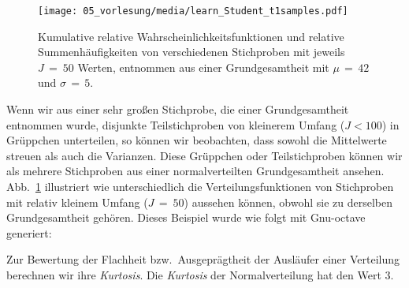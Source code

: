 \begin{figure}
\begin{center}
\texttt{[image: 05\_vorlesung/media/learn\_Student\_t1samples.pdf]}
\caption{\label{kumulWahrsch} Kumulative relative Wahrscheinlichkeitsfunktionen und relative
Summenhäufigkeiten von verschiedenen Stichproben mit jeweils $J \, = \ 50$ Werten, entnommen aus einer
Grundgesamtheit mit $\mu \, = \, 42$ und $\sigma \, = \, 5$.}
\end{center}
\end{figure}
Wenn wir aus einer sehr großen Stichprobe, die einer Grundgesamtheit entnommen wurde,
disjunkte Teilstichproben von kleinerem Umfang ($J < 100$) in Grüppchen unterteilen, so können wir
beobachten, dass sowohl die Mittelwerte streuen als auch die Varianzen.
Diese Grüppchen oder Teilstichproben können wir als mehrere Stichproben aus einer normalverteilten
Grundgesamtheit ansehen.
Abb.~\ref{kumulWahrsch} illustriert wie unterschiedlich die Verteilungsfunktionen von
Stichproben mit relativ kleinem Umfang ($J \, = \ 50$) aussehen können, obwohl sie zu derselben
Grundgesamtheit gehören. Dieses Beispiel wurde wie folgt mit Gnu-octave generiert:



Zur Bewertung der Flachheit bzw.\ Ausgeprägtheit der Ausläufer einer Verteilung berechnen wir
ihre \textsl{Kurtosis}. Die \textsl{Kurtosis} der Normalverteilung hat den Wert $3$.

